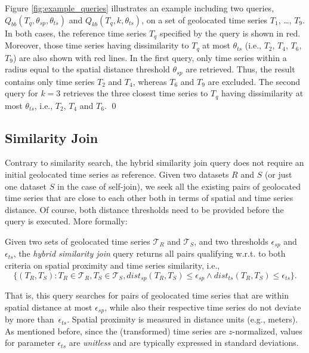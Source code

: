 \begin{myexample}
 Figure \ref{fig:example_queries} illustrates an example including two queries, $Q_{bb}(T_q, \theta_{sp}, \theta_{ts})$ and $Q_{kb}(T_q, k, \theta_{ts})$, on a set of geolocated time series $T_1$, \ldots, $T_9$. In both cases, the reference time series $T_q$ specified by the query is shown in red. Moreover, those time series having dissimilarity to $T_q$ at most $\theta_{ts}$ (i.e., $T_2$, $T_4$, $T_6$, $T_9$) are also shown with red lines. In the first query, only time series within a radius equal to the spatial distance threshold $\theta_{sp}$ are retrieved. Thus, the result contains only time series $T_2$ and $T_4$, whereas $T_6$ and $T_9$ are excluded. The second query for $k=3$ retrieves the three closest time series to $T_q$ having dissimilarity at most $\theta_{ts}$, i.e., $T_2$, $T_4$ and $T_6$. \qed
\end{myexample}

\subsection{Similarity Join}
\label{subsec:sim_join_prob}
Contrary to similarity search, the hybrid similarity join query does not require an initial geolocated time series as reference. Given two datasets $R$ and $S$ (or just one dataset $S$ in the case of self-join), we seek all the existing pairs of geolocated time series that are close to each other both in terms of spatial and time series distance. Of course, both distance thresholds need to be provided before the query is executed. More formally:

\begin{mydefinition}\label{def:sim_join}
  Given two sets of geolocated time series $\mathcal{T}_{R}$ and $\mathcal{T}_{S}$, and two thresholds $\epsilon_{sp}$ and $\epsilon_{ts}$, the {\em hybrid similarity join} query returns all pairs qualifying w.r.t. to both criteria on spatial proximity and time series similarity, i.e., 
  \[ \{ (T_{R}, T_{S}): T_{R} \in \mathcal{T}_{R}, T_{S} \in \mathcal{T}_{S}, dist_{sp}(T_{R}, T_{S})\leq\epsilon_{sp} \land dist_{ts}(T_{R}, T_{S}) \leq \epsilon_{ts} \}. \] 
\end{mydefinition} 
 
That is, this query searches for pairs of geolocated time series that are within spatial distance at most $\epsilon_{sp}$, while also their respective time series do not deviate by more than~$\epsilon_{ts}$. Spatial proximity is measured in distance units (e.g., meters). As mentioned before, since the (transformed) time series are $z$-normalized, values for parameter $\epsilon_{ts}$ are {\em unitless} and are typically expressed in standard deviations.
  
